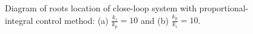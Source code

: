 \begin{figure}
	\centering
	\hfill
	\caption{Diagram of roots location of close-loop system with proportional-integral control method: (a) $\frac{k_i}{k_p}=10$ and (b) $\frac{k_p}{k_i}=10$.}
	\label{fig:q5_bode_T_PI}
\end{figure}

